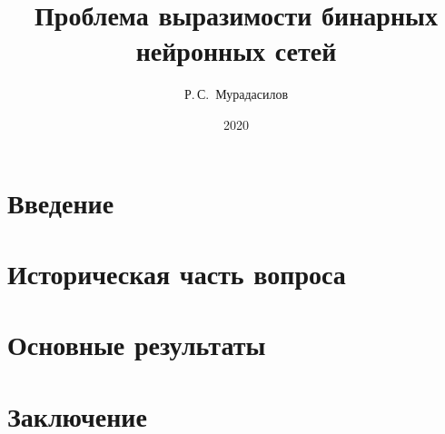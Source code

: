 \documentclass[a4paper, 14pt]{extarticle}
\title{Проблема выразимости бинарных нейронных сетей}
\author{Р.\,С.~Мурадасилов}
\date{2020}
\theoremstyle{definition}
\begin{document}




\setcounter{page}{2}
\newpage

\tableofcontents
\newpage

\section{Введение}

\newpage

\section{Историческая часть вопроса}

\newpage

\section{Основные результаты}

\newpage

\section{Заключение}

\newpage


    
\end{document}
